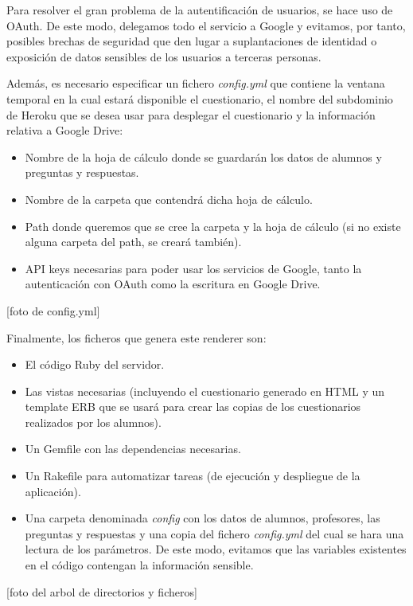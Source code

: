 Para resolver el gran problema de la autentificaci\'on de usuarios, se hace uso de OAuth. De este modo, delegamos todo el servicio a Google y evitamos, por tanto,
posibles brechas de seguridad que den lugar a suplantaciones de identidad o exposici\'on de datos sensibles de los usuarios a terceras personas.
\bigskip

Adem\'as, es necesario especificar un fichero \textit{config.yml} que contiene la ventana temporal en la cual estar\'a disponible
el cuestionario, el nombre del subdominio de Heroku que se desea usar para desplegar el cuestionario y la informaci\'on relativa a Google Drive:
\begin{itemize}
  \item Nombre de la hoja de c\'alculo donde se guardar\'an los datos de alumnos y preguntas y respuestas.
  \item Nombre de la carpeta que contendr\'a dicha hoja de c\'alculo.
  \item Path donde queremos que se cree la carpeta y la hoja de c\'alculo (si no existe alguna carpeta del path, se crear\'a tambi\'en).
  \item API keys necesarias para poder usar los servicios de Google, tanto la autenticaci\'on con OAuth como la escritura en Google Drive.
\end{itemize}

[foto de config.yml]
\bigskip

Finalmente, los ficheros que genera este renderer son:
\begin{itemize}
  \item El c\'odigo Ruby del servidor.
  \item Las vistas necesarias (incluyendo el cuestionario generado en HTML y un template ERB que se usar\'a para crear las copias de los cuestionarios
  realizados por los alumnos).
  \item Un Gemfile con las dependencias necesarias.
  \item Un Rakefile para automatizar tareas (de ejecuci\'on y despliegue de la aplicaci\'on).
  \item Una carpeta denominada \textit{config} con los datos de alumnos, profesores, las preguntas y respuestas y una copia del fichero \textit{config.yml}
  del cual se hara una lectura de los par\'ametros. De este modo, evitamos que las variables existentes en el c\'odigo contengan la informaci\'on sensible.
\end{itemize}

[foto del arbol de directorios y ficheros]

